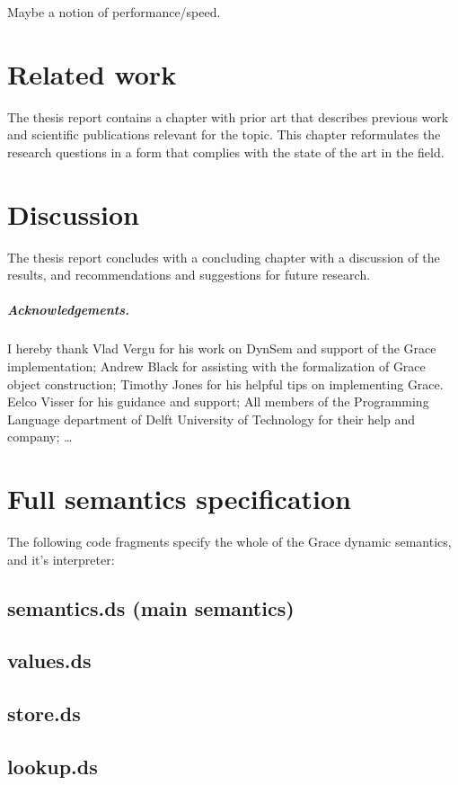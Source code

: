 \documentclass[a4paper,UKenglish]{lipics-v2016}
\begin{document}
Maybe a notion of performance/speed.

\section{Related work}
The thesis report contains a chapter with prior art that describes previous work and scientific publications relevant for the topic. This chapter reformulates the research questions in a form that complies with the state of the art in the field.

\section{Discussion}
The thesis report concludes with a concluding chapter with a discussion of the results, and recommendations and suggestions for future research.



\subparagraph*{Acknowledgements.}

I hereby thank Vlad Vergu for his work on DynSem and support of the Grace implementation; Andrew Black for assisting with the formalization of Grace object construction; Timothy Jones for his helpful tips on implementing Grace. Eelco Visser for his guidance and support; All members of the Programming Language department of Delft University of Technology for their help and company; \dots

\appendix
\section{Full semantics specification}
The following code fragments specify the whole of the Grace dynamic semantics, and it's interpreter:
\subsection{semantics.ds (main semantics)}

\subsection{values.ds}

\subsection{store.ds}

\subsection{lookup.ds}

\end{document}

